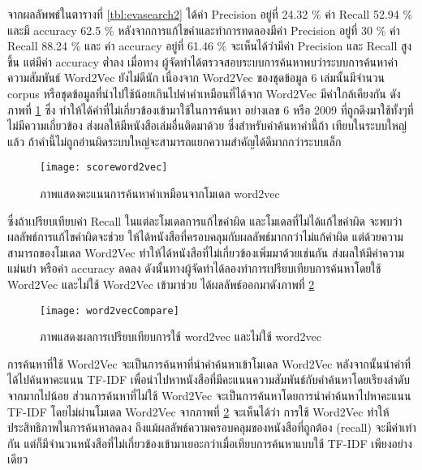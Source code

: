     จากผลลัพพธ์ในตารางที่ \ref{tbl:evasearch2} ได้ค่า Precision อยู่ที่ 24.32 \% ค่า Recall 52.94 \% และมี 
    accuracy 62.5 \% หลังจากการแก้ไขคำและทำการทดลองมีค่า Precision อยู่ที่ 30 \% ค่า Recall 88.24 \% และ
    ค่า accuracy อยู่ที่ 61.46 \% จะเห็นได้ว่ามีค่า Precision และ Recall สูงขึ้น แต่มีค่า accuracy ต่ำลง เมื่อทาง
    ผู้จัดทำได้ตรวจสอบระบบการค้นหาพบว่าระบบการค้นหาค่าความสัมพันธ์ Word2Vec ยังไม่ดีนัก เนื่องจาก 
    Word2Vec ของชุดข้อมูล 6 เล่มนั้นมีจำนวน corpus หรือชุดข้อมูลที่นำไปใช้น้อยเกินไปค่าคำเหมือนที่ได้จาก 
    Word2Vec มีค่าใกล้เคียงกัน ดังภาพที่ \ref{fig:scoreword2vec} ซึ่ง ทำให้ได้คำที่ไม่เกี่ยวข้องเข้ามาใช้ในการค้นหา อย่างเลข 6 
    หรือ 2009 ที่ถูกดึงมาใช้ทั้งๆที่ไม่มีความเกี่ยวข้อง ส่งผลให้มีหนังสือเล่มอื่นติดมาด้วย ซึ่งสำหรับคำค้นหาคำนี้ถ้า
    เทียบในระบบใหญ่แล้ว ถ้าคำนี้ไม่ถูกอ่านผิดระบบใหญ่จะสามารถแยกความสำคัญได้ดีมากกว่าระบบเล็ก
    
\begin{figure}[H]
    \centering
    \texttt{[image: scoreword2vec]}
    \caption{ภาพแสดงคะแนนการค้นหาคำเหมือนจากโมเดล word2vec}\label{fig:scoreword2vec}
\end{figure}

ซึ่งถ้าเปรียบเทียบค่า Recall ในแต่ละโมเดลการแก้ไขคำผิด และโมเดลที่ไม่ได้แก้ไขคำผิด จะพบว่าผลลัพธ์การแก้ไขคำผิดจะช่วย
ให้ได้หนังสือที่ครอบคลุมกับผลลัพธ์มากกว่าไม่แก้คำผิด แต่ด้วยความสามารถของโมเดล 
Word2Vec ทำให้ได้หนังสือที่ไม่เกี่ยวข้องเพิ่มมาด้วยเช่นกัน ส่งผลให้มีค่าความแม่นยำ 
หรือค่า accuracy ลดลง ดังนั้นทางผู้จัดทำได้ลองทำการเปรียบเทียบการค้นหาโดยใช้ 
Word2Vec และไม่ใช้ Word2Vec เข้ามาช่วย ได้ผลลัพธ์ออกมาดังภาพที่ \ref{fig:word2vecCompare}

\begin{figure}[H]
    \centering
    \texttt{[image: word2vecCompare]}
    \caption{ภาพแสดงผลการเปรียบเทียบการใช้ word2vec และไม่ใช้ word2vec}\label{fig:word2vecCompare}
\end{figure}

การค้นหาที่ใช้ Word2Vec จะเป็นการค้นหาที่นำคำค้นหาเข้าโมเดล Word2Vec หลังจากนั้นนำคำที่ได้ไปค้นหาคะแนน TF-IDF เพื่อนำไปหาหนังสือที่มีคะแนนความสัมพันธ์กับคำค้นหาโดยเรียงลำดับจากมากไปน้อย 
ส่วนการค้นหาที่ไม่ใช้ Word2Vec จะเป็นการค้นหาโดยการนำคำค้นหาไปหาคะแนน TF-IDF โดยไม่ผ่านโมเดล Word2Vec
จากภาพที่ \ref{fig:word2vecCompare}  จะเห็นได้ว่า การใช้ Word2Vec ทำให้ประสิทธิภาพในการค้นหาลดลง ถึงแม้ผลลัพธ์ความครอบคลุมของหนังสือที่ถูกต้อง (recall) จะมีค่าเท่ากัน 
แต่ก็มีจำนวนหนังสือที่ไม่เกี่ยวข้องเข้ามาเยอะกว่าเมื่อเทียบการค้นหาแบบใช้ TF-IDF เพียงอย่างเดียว



